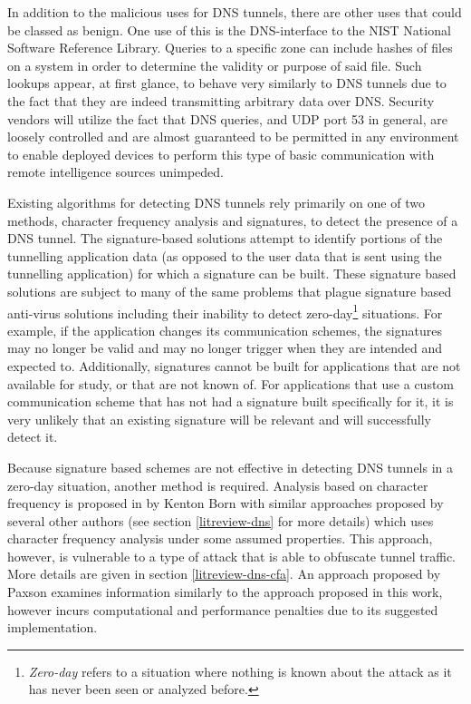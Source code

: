\documentclass[12pt]{report}
\theoremstyle{remark}
\theoremstyle{definition}
\theoremstyle{definition}
\theoremstyle{definition}
\begin{document}
In addition to the malicious uses for DNS tunnels, there are other uses that
could be classed as benign. One use of this is the DNS-interface to the NIST
National Software Reference Library\cite{sans-dnshash}. Queries to a specific
zone can include hashes of files on a system in order to determine the validity
or purpose of said file. Such lookups appear, at first glance, to behave very
similarly to DNS tunnels due to the fact that they are indeed transmitting
arbitrary data over DNS. Security vendors will utilize the fact that DNS
queries, and UDP port 53 in general, are loosely controlled and are almost
guaranteed to be permitted in any environment to enable deployed devices to
perform this type of basic communication with remote intelligence sources
unimpeded.

Existing algorithms for detecting DNS tunnels rely primarily on one of two
methods, character frequency analysis and signatures, to detect the presence of
a DNS tunnel. The signature-based solutions attempt to identify portions of the
tunnelling application data (as opposed to the user data that is sent using the
tunnelling application) for which a signature can be built. These signature
based solutions are subject to many of the same problems that plague signature
based anti-virus solutions including their inability to detect
zero-day\footnote{\emph{Zero-day} refers to a situation where nothing is known
about the attack as it has never been seen or analyzed before.} situations. For
example, if the application changes its communication schemes, the signatures
may no longer be valid and may no longer trigger when they are intended and
expected to. Additionally, signatures cannot be built for applications that are
not available for study, or that are not known of. For applications that use a
custom communication scheme that has not had a signature built specifically for
it, it is very unlikely that an existing signature will be relevant and will
successfully detect it.

Because signature based schemes are not effective in detecting DNS tunnels in a
zero-day situation, another method is required. Analysis based on character
frequency is proposed in\cite{Born2010.cfa} by Kenton Born with similar
approaches proposed by several other authors (see section \ref{litreview-dns}
for more details) which uses character frequency analysis under some assumed
properties. This approach, however, is vulnerable to a type of attack that is
able to obfuscate tunnel traffic. More details are given in section
\ref{litreview-dns-cfa}. An approach proposed by Paxson\cite{Paxson2011}
examines information similarly to the approach proposed in this work, however
incurs computational and performance penalties due to its suggested
implementation.
\end{document}
